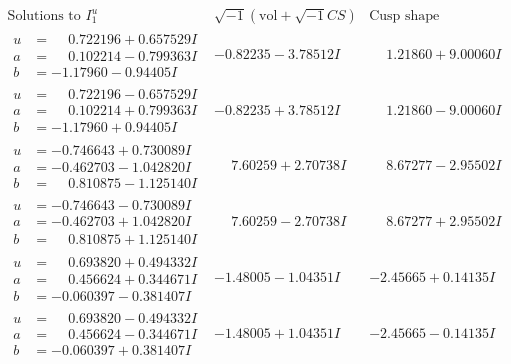 \documentclass[1p]{elsarticle_modified}
\theoremstyle{definition}
\newcommand{\I}{\sqrt{-1}}
\begin{document}
$$\begin{array}{c|c|c}  
\text{Solutions to }I^u_{1}& \I (\text{vol} + \sqrt{-1}CS) & \text{Cusp shape}\\
 \hline 
\begin{aligned}
u &= \phantom{-}0.722196 + 0.657529 I \\
a &= \phantom{-}0.102214 - 0.799363 I \\
b &= -1.17960 - 0.94405 I\end{aligned}
 & -0.82235 - 3.78512 I & \phantom{-}1.21860 + 9.00060 I \\ \hline\begin{aligned}
u &= \phantom{-}0.722196 - 0.657529 I \\
a &= \phantom{-}0.102214 + 0.799363 I \\
b &= -1.17960 + 0.94405 I\end{aligned}
 & -0.82235 + 3.78512 I & \phantom{-}1.21860 - 9.00060 I \\ \hline\begin{aligned}
u &= -0.746643 + 0.730089 I \\
a &= -0.462703 - 1.042820 I \\
b &= \phantom{-}0.810875 - 1.125140 I\end{aligned}
 & \phantom{-}7.60259 + 2.70738 I & \phantom{-}8.67277 - 2.95502 I \\ \hline\begin{aligned}
u &= -0.746643 - 0.730089 I \\
a &= -0.462703 + 1.042820 I \\
b &= \phantom{-}0.810875 + 1.125140 I\end{aligned}
 & \phantom{-}7.60259 - 2.70738 I & \phantom{-}8.67277 + 2.95502 I \\ \hline\begin{aligned}
u &= \phantom{-}0.693820 + 0.494332 I \\
a &= \phantom{-}0.456624 + 0.344671 I \\
b &= -0.060397 - 0.381407 I\end{aligned}
 & -1.48005 - 1.04351 I & -2.45665 + 0.14135 I \\ \hline\begin{aligned}
u &= \phantom{-}0.693820 - 0.494332 I \\
a &= \phantom{-}0.456624 - 0.344671 I \\
b &= -0.060397 + 0.381407 I\end{aligned}
 & -1.48005 + 1.04351 I & -2.45665 - 0.14135 I \\ \hline\begin{aligned}

\end{aligned}
\end{array}$$
\end{document}
